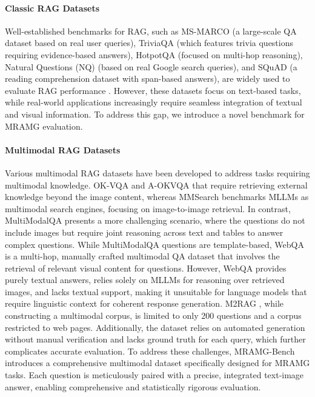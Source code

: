 \paragraph{Classic RAG Datasets}
Well-established benchmarks for RAG, such as MS-MARCO \citep{MSMARCO} (a large-scale QA dataset based on real user queries), TriviaQA \citep{joshi2017triviaqa} (which features trivia questions requiring evidence-based answers), HotpotQA \citep{yang2018hotpotqa} (focused on multi-hop reasoning), Natural Questions (NQ) \citep{Naturalquestions} (based on real Google search queries), and SQuAD \citep{rajpurkar2016squad} (a reading comprehension dataset with span-based answers), are widely used to evaluate RAG performance \citep{petroni2020kilt, QAE}. 
However, these datasets focus on text-based tasks, while real-world applications increasingly require seamless integration of textual and visual information. To address this gap, we introduce a novel benchmark for MRAMG evaluation.
\paragraph{Multimodal RAG Datasets}
Various multimodal RAG datasets have been developed to address tasks requiring multimodal knowledge. 
OK-VQA \citep{marino2019ok} and A-OKVQA \citep{schwenk2022okvqa} that require retrieving external knowledge beyond the image content, whereas MMSearch \citep{jiang2024mmsearch} benchmarks MLLMs as multimodal search engines, focusing on image-to-image retrieval.
In contrast, MultiModalQA \citep{talmor2021multimodalqa} presents a more challenging scenario, where the questions do not include images but require joint reasoning across text and tables to answer complex questions.
While MultiModalQA questions are template-based, WebQA \citep{chang2022webqa} is a multi-hop, manually crafted multimodal QA dataset that involves the retrieval of relevant visual content for questions.
However, WebQA provides purely textual answers, relies solely on MLLMs for reasoning over retrieved images, and lacks textual support, making it unsuitable for language models that require linguistic context for coherent response generation.
M2RAG \citep{ma2024multi}, while constructing a multimodal corpus, is limited to only 200 questions and a corpus restricted to web pages. 
Additionally, the dataset relies on automated generation without manual verification and lacks ground truth for each query, which further complicates accurate evaluation.
To address these challenges, MRAMG-Bench introduces a comprehensive
multimodal dataset specifically designed for MRAMG tasks.  
Each question is meticulously paired with a precise, integrated text-image answer, enabling comprehensive and statistically rigorous evaluation.
\fi


